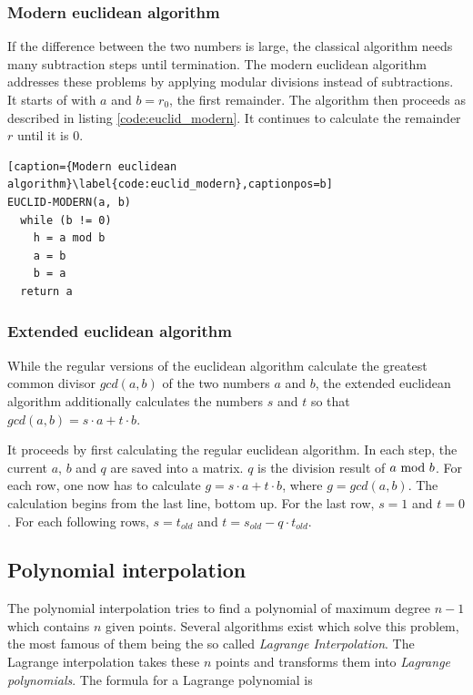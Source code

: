 \subsubsection{Modern euclidean algorithm}

If the difference between the two numbers is large, the classical algorithm
needs many subtraction steps until termination. The modern euclidean algorithm
addresses these problems by applying modular divisions instead of subtractions.
It starts of with $a$ and $b = r_0$, the first remainder. The algorithm then
proceeds as described in listing \ref{code:euclid_modern}. It continues to
calculate the remainder $r$ until it is $0$.

\begin{lstlisting}[caption={Modern euclidean algorithm}\label{code:euclid_modern},captionpos=b]
EUCLID-MODERN(a, b)
  while (b != 0)
    h = a mod b
    a = b
    b = a
  return a
\end{lstlisting}

\subsubsection{Extended euclidean algorithm}

While the regular versions of the euclidean algorithm calculate the greatest
common divisor $gcd(a, b)$ of the two numbers $a$ and $b$, the extended
euclidean algorithm additionally calculates the numbers $s$ and $t$ so
that $gcd(a, b) = s \cdot a + t \cdot b$.

It proceeds by first calculating the regular euclidean algorithm. In each
step, the current $a$, $b$ and $q$ are saved into a matrix. $q$ is the division
result of $a \ \text{mod}\ b$. For each row, one now has to calculate
$g = s \cdot a + t \cdot b$, where $g = gcd(a, b)$. The calculation begins from
the last line, bottom up. For the last row, $s = 1$ and $t = 0$. For each
following rows, $s = t_{old}$ and $t = s_{old} - q \cdot t_{old}$.

\subsection{Polynomial interpolation}

The polynomial interpolation tries to find a polynomial of maximum degree $n - 1$ which
contains $n$ given points. Several algorithms exist which solve this problem,
the most famous of them being the so called \textit{Lagrange Interpolation}. The
Lagrange interpolation takes these $n$ points and transforms them into \textit{Lagrange
polynomials}. The formula for a Lagrange polynomial is

